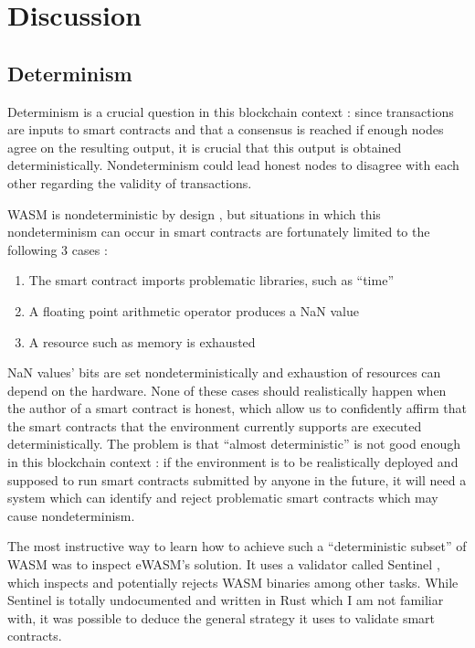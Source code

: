 \documentclass[11pt, a4paper, twoside, openright]{article}
\begin{document}
\section{Discussion}

\subsection{Determinism}

Determinism is a crucial question in this blockchain context : since transactions are inputs to smart contracts and that a consensus is reached if enough nodes agree on the resulting output, it is crucial that this output is obtained deterministically. Nondeterminism could lead honest nodes to disagree with each other regarding the validity of transactions.

WASM is nondeterministic by design \cite{nondeterminism}, but situations in which this nondeterminism can occur in smart contracts are fortunately limited to the following 3 cases :

\begin{enumerate}

\itemsep0em

 \item The smart contract imports problematic libraries, such as ``time''
 \item A floating point arithmetic operator produces a NaN value
 \item A resource such as memory is exhausted
 
\end{enumerate} 
 
NaN values' bits are set nondeterministically and exhaustion of resources can depend on the hardware. None of these cases should realistically happen when the author of a smart contract is honest, which allow us to confidently affirm that the smart contracts that the environment currently supports are executed deterministically. The problem is that ``almost deterministic'' is not good enough in this blockchain context : if the environment is to be realistically deployed and supposed to run smart contracts submitted by anyone in the future, it will need a system which can identify and reject problematic smart contracts which may cause nondeterminism.

The most instructive way to learn how to achieve such a ``deterministic subset'' of WASM was to inspect eWASM's solution. It uses a validator called Sentinel \cite{sentinel}, which inspects and potentially rejects WASM binaries among other tasks. While Sentinel is totally undocumented and written in Rust which I am not familiar with, it was possible to deduce the general strategy it uses to validate smart contracts.
\end{document}
